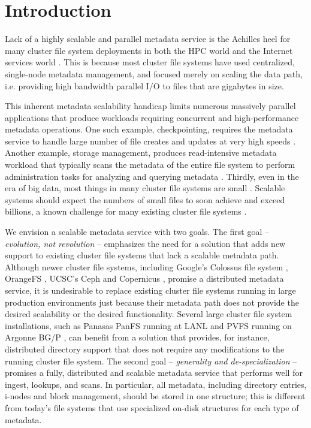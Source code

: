 \section{Introduction}
Lack of a highly scalable and parallel metadata service is the
Achilles heel for many cluster file system deployments in both the HPC world
\cite{hpcs-io:2008, hecfsio:tr06} and the Internet services world \cite{HDFS}.
This is because most cluster file systems have used centralized, single-node
metadata management, and focused merely on scaling the data path,
i.e. providing high bandwidth parallel I/O to files that are gigabytes in size.


This inherent metadata scalability handicap limits numerous massively parallel
applications that produce workloads
requiring concurrent and high-performance metadata operations.
One such example, checkpointing, requires the metadata service to
handle large number of file creates and updates at very high speeds \cite{PLFS}.
Another example, storage management, produces read-intensive metadata workload
that typically scans the metadata of the entire file system to perform
administration tasks for analyzing and querying metadata \cite{filemgmt-ucsc, magellan-ucsc}.
Thirdly, even in the era of big data,
most things in many cluster file systems are small \cite{Dayal, brent13}.
Scalable systems should expect the numbers of small files
to soon achieve and exceed billions,
a known challenge for many existing cluster file systems \cite{GIGA11}.

We envision a scalable metadata service with two goals.
The first goal -- \textit{evolution, not revolution} -- emphasizes the need for
a solution that adds new support to existing cluster file systems that lack a
scalable metadata path.
Although newer cluster file systems, including Google's Colossus file system
\cite{50mfiles-in-googlefs:fikes10}, OrangeFS \cite{OrangeFS}, UCSC's Ceph \cite{ceph:weil06} and 
Copernicus \cite{sfs-ucsc}, promise a distributed metadata
service, it is
undesirable to replace existing cluster file systems running in large production
environments just because their metadata path does not provide the desired
scalability or the desired functionality.
Several large cluster file system installations, such as Panasas PanFS running
at LANL \cite{panfs:welch08} and PVFS running on Argonne BG/P
\cite{bgp, pvfs:www}, can benefit from a solution that provides,
for instance, distributed directory support
that does not require any modifications to the running cluster file system.
The second goal -- \textit{generality and de-specialization} -- promises a
fully, distributed and
scalable metadata service that performs well for ingest, lookups, and scans.
In particular, all metadata, including directory entries, i-nodes and block
management, should be stored in one structure; this is different from
today's file systems that use specialized on-disk structures for each type of
metadata.

